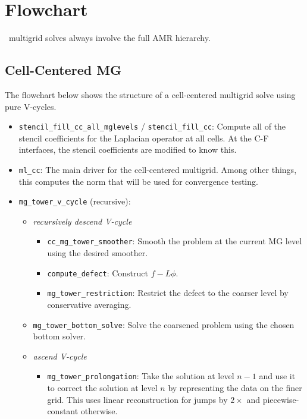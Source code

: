 \section{Flowchart}

\maestro\ multigrid solves always involve the full AMR hierarchy.



\subsection{Cell-Centered MG}

The flowchart below shows the structure of a cell-centered multigrid
solve using pure V-cycles.


\begin{itemize}

\item {\tt stencil\_fill\_cc\_all\_mglevels} / {\tt stencil\_fill\_cc}:
  Compute all of the stencil coefficients
  for the Laplacian operator at all cells.  At the C-F interfaces, the
  stencil coefficients are modified to know this.

\item {\tt ml\_cc}: The main driver for the cell-centered multigrid.
   Among other things, this computes the norm that will be used
   for convergence testing.

\item {\tt mg\_tower\_v\_cycle} (recursive):
\begin{itemize}

  \item {\em recursively descend V-cycle}
  \begin{itemize} 
  \item {} {\tt cc\_mg\_tower\_smoother}: Smooth the 
    problem at the current MG level using the desired smoother.

  \item {\tt compute\_defect}: Construct $f - L\phi$.

  \item{} {\tt mg\_tower\_restriction}:  Restrict
    the defect to the coarser level by conservative averaging.
  \end{itemize}

  \item {\tt mg\_tower\_bottom\_solve}:  Solve the coarsened problem
    using the chosen bottom solver.

  \item {\em ascend V-cycle}
  \begin{itemize}
  \item{} {\tt mg\_tower\_prolongation}: Take the solution at level $n-1$ and use it to 
     correct the solution at level $n$ by representing the data on the finer grid.  This uses
     linear reconstruction for jumps by $2\times$ and piecewise-constant otherwise.


\end{itemize}
\end{itemize}
\end{itemize}
